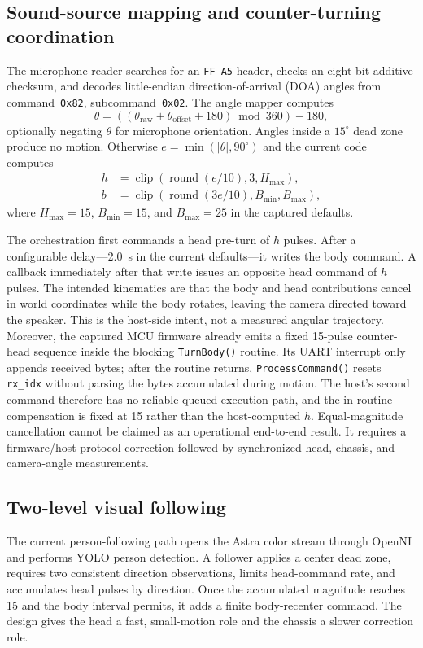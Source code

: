 \documentclass[conference]{IEEEtran}
\newcommand{\code}[1]{\texttt{#1}}
\begin{document}
\subsection{Sound-source mapping and counter-turning coordination}
The microphone reader searches for an \code{FF A5} header, checks an eight-bit additive checksum, and decodes little-endian direction-of-arrival (DOA) angles from command~\code{0x82}, subcommand~\code{0x02}. The angle mapper computes
\begin{equation}
\theta = ((\theta_{\mathrm{raw}}+\theta_{\mathrm{offset}}+180)\bmod 360)-180,
\end{equation}
optionally negating $\theta$ for microphone orientation. Angles inside a $15^\circ$ dead zone produce no motion. Otherwise $e=\min(|\theta|,90^\circ)$ and the current code computes
\begin{align}
h &= \operatorname{clip}(\operatorname{round}(e/10),3,H_{\max}),\\
b &= \operatorname{clip}(\operatorname{round}(3e/10),B_{\min},B_{\max}),
\end{align}
where $H_{\max}=15$, $B_{\min}=15$, and $B_{\max}=25$ in the captured defaults.

The orchestration first commands a head pre-turn of $h$ pulses. After a configurable delay---2.0~s in the current defaults---it writes the body command. A callback immediately after that write issues an opposite head command of $h$ pulses. The intended kinematics are that the body and head contributions cancel in world coordinates while the body rotates, leaving the camera directed toward the speaker. This is the host-side intent, not a measured angular trajectory. Moreover, the captured MCU firmware already emits a fixed 15-pulse counter-head sequence inside the blocking \code{TurnBody()} routine. Its UART interrupt only appends received bytes; after the routine returns, \code{ProcessCommand()} resets \code{rx\_idx} without parsing the bytes accumulated during motion. The host's second command therefore has no reliable queued execution path, and the in-routine compensation is fixed at 15 rather than the host-computed $h$. Equal-magnitude cancellation cannot be claimed as an operational end-to-end result. It requires a firmware/host protocol correction followed by synchronized head, chassis, and camera-angle measurements.



\subsection{Two-level visual following}
The current person-following path opens the Astra color stream through OpenNI and performs YOLO person detection. A follower applies a center dead zone, requires two consistent direction observations, limits head-command rate, and accumulates head pulses by direction. Once the accumulated magnitude reaches 15 and the body interval permits, it adds a finite body-recenter command. The design gives the head a fast, small-motion role and the chassis a slower correction role.
\end{document}
